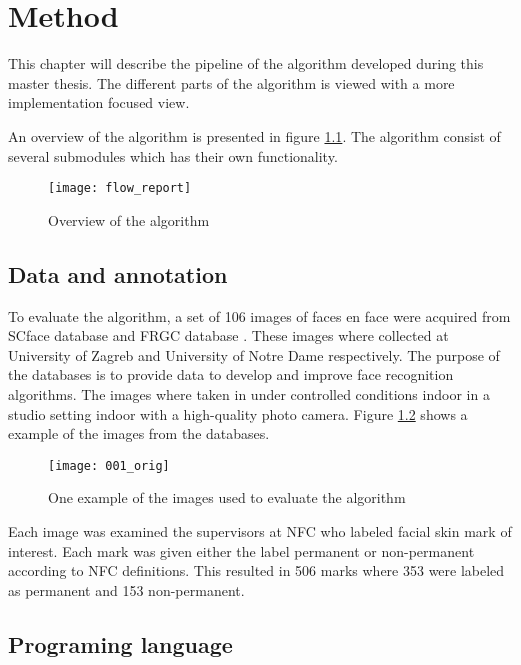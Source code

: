 \chapter{Method}\label{cha:method}

This chapter will describe the pipeline of the algorithm developed during this master thesis. The different parts of the algorithm is viewed with a more implementation focused view.

 An overview of the algorithm is presented in figure \ref{fig:detection_flow}. The algorithm consist of several submodules which has their own functionality.

\FloatBarrier
 \begin{figure}[h]
 	\centering
 	\texttt{[image: flow\_report]}
 	\caption{Overview of the algorithm \label{fig:detection_flow}}
 \end{figure}
\FloatBarrier

\section{Data and annotation}

To evaluate the algorithm, a set of 106 images of faces en face were acquired from SCface database \cite{SCface} and FRGC database \cite{FRGC}. These images where collected at University of Zagreb and University of Notre Dame respectively. The purpose of the databases is to provide data to develop and improve face recognition algorithms. The images where taken in under controlled conditions indoor in a studio setting indoor with a high-quality photo camera. Figure \ref{fig:orig_img} shows a example of the images from the databases.

\FloatBarrier
\begin{figure}[h]
	\centering
	\texttt{[image: 001\_orig]}
	\caption{One example of the images used to evaluate the algorithm \label{fig:orig_img}}
\end{figure}
\FloatBarrier

Each image was examined the supervisors at NFC who labeled facial skin mark of interest. Each mark was given either the label permanent or non-permanent according to NFC definitions. This resulted in 506 marks where 353 were labeled as permanent and 153 non-permanent.

\section{Programing language}

